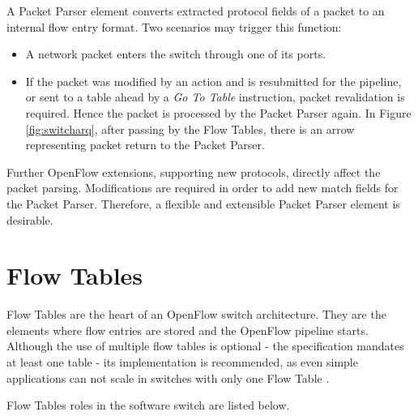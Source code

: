 	A Packet Parser element converts extracted protocol fields of a packet to an internal flow entry format. Two scenarios may trigger this function:   

	\begin{itemize}

	\item A network packet enters the switch through one of its ports.    

	\item  If the packet was modified by an action and is resubmitted for the pipeline, or sent to a table ahead by a \textit{Go To Table} instruction, packet revalidation is required. Hence the packet is processed by the Packet Parser again. In Figure \ref{fig:switcharq}, after passing by the Flow Tables, there is an arrow representing packet return to the Packet Parser.        

	\end{itemize}

	Further OpenFlow extensions, supporting new protocols, directly affect the packet parsing. Modifications are required in order to add new match fields for the Packet Parser. Therefore, a flexible and extensible Packet Parser element is desirable.  

	\section{Flow Tables}

	Flow Tables are the heart of an OpenFlow switch architecture. They are the elements where flow entries are stored and the OpenFlow pipeline starts. Although the use of multiple flow tables is optional - the specification mandates at least one table - its implementation is recommended, as even simple applications can not scale in switches with only one Flow Table \cite{tableExplosion}.  
	
	Flow Tables roles in the software switch are listed below.

